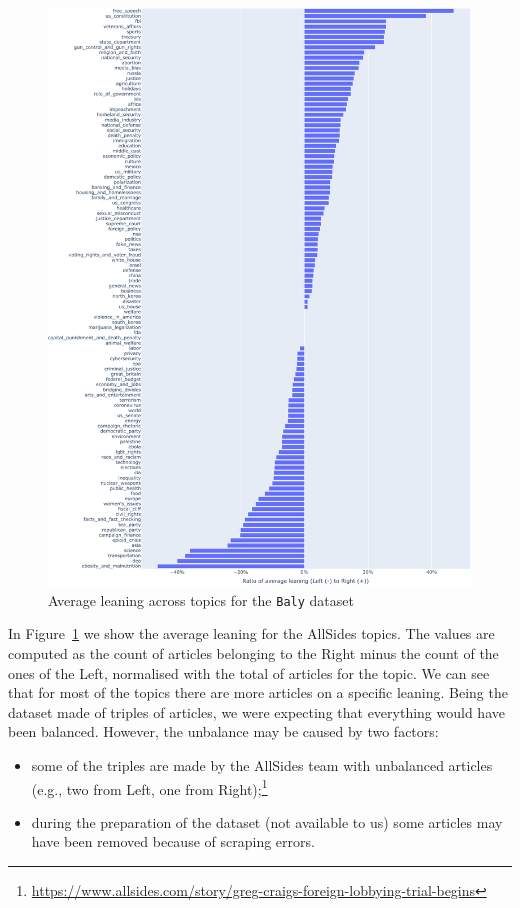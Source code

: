 \begin{figure}[!htbp]
    \centering
    \includegraphics[width=\linewidth]{figures/baly_original_topics_by_leaning_simple.pdf}
    \caption{Average leaning across topics for the \texttt{Baly} dataset}
    \label{fig:baly_original_topics_by_leaning}
\end{figure}

In Figure~\ref{fig:baly_original_topics_by_leaning} we show the average leaning for the AllSides topics.
The values are computed as the count of articles belonging to the Right minus the count of the ones of the Left, normalised with the total of articles for the topic.
We can see that for most of the topics
there are more articles on a specific leaning. Being the dataset made of triples of articles, we were expecting that everything would have been balanced.
However, the unbalance may be caused by two factors:
\begin{itemize}
    \item some of the triples are made by the AllSides team with unbalanced articles (e.g., two from Left, one from Right);\footnote{\url{https://www.allsides.com/story/greg-craigs-foreign-lobbying-trial-begins}}
    \item during the preparation of the dataset (not available to us) some articles may have been removed because of scraping errors.
\end{itemize}


